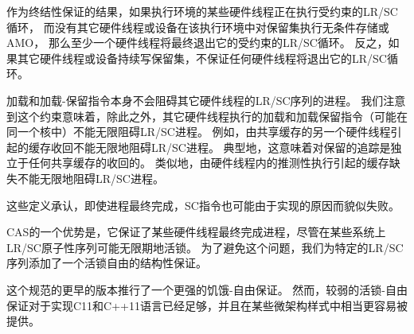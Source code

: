 \begin{commentary}
  作为终结性保证的结果，如果执行环境的某些硬件线程正在执行受约束的LR/SC循环，
  而没有其它硬件线程或设备在该执行环境中对保留集执行无条件存储或AMO，
  那么至少一个硬件线程将最终退出它的受约束的LR/SC循环。
  反之，如果其它硬件线程或设备持续写保留集，不保证任何硬件线程将退出它的LR/SC循环。

加载和加载-保留指令本身不会阻碍其它硬件线程的LR/SC序列的进程。
我们注意到这个约束意味着，除此之外，其它硬件线程执行的加载和加载保留指令（可能在同一个核中）不能无限阻碍LR/SC进程。
例如，由共享缓存的另一个硬件线程引起的缓存收回不能无限地阻碍LR/SC进程。
典型地，这意味着对保留的追踪是独立于任何共享缓存的收回的。
类似地，由硬件线程内的推测性执行引起的缓存缺失不能无限地阻碍LR/SC进程。

这些定义承认，即使进程最终完成，SC指令也可能由于实现的原因而貌似失败。
\end{commentary}

\begin{commentary}
  CAS的一个优势是，它保证了某些硬件线程最终完成进程，尽管在某些系统上LR/SC原子性序列可能无限期地活锁。
  为了避免这个问题，我们为特定的LR/SC序列添加了一个活锁自由的结构性保证。

这个规范的更早的版本推行了一个更强的饥饿-自由保证。
然而，较弱的活锁-自由保证对于实现C11和C++11语言已经足够，并且在某些微架构样式中相当更容易被提供。
\end{commentary}


